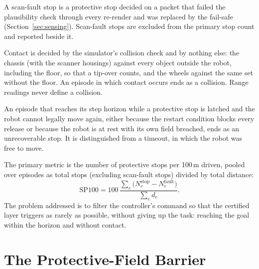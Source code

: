 \documentclass[sensors,article,submit,moreauthors]{Definitions/mdpi}
\begin{document}
\begin{Definition}\label{def:scanfault}
A scan-fault stop is a protective stop decided on a packet that failed the plausibility check through every re-render and was replaced by the fail-safe (Section~\ref{sec:sensing}). Scan-fault stops are excluded from the primary stop count and reported beside it.
\end{Definition}

\begin{Definition}\label{def:contact}
Contact is decided by the simulator's collision check and by nothing else: the chassis (with the scanner housings) against every object outside the robot, including the floor, so that a tip-over counts, and the wheels against the same set without the floor. An episode in which contact occurs ends as a collision. Range readings never define a collision.
\end{Definition}

\begin{Definition}\label{def:unrecoverable}
An episode that reaches its step horizon while a protective stop is latched and the robot cannot legally move again, either because the restart condition blocks every release or because the robot is at rest with its own field breached, ends as an unrecoverable stop. It is distinguished from a timeout, in which the robot was free to move.
\end{Definition}

\noindent The primary metric is the number of protective stops per 100\,m driven, pooled over episodes as total stops (excluding scan-fault stops) divided by total distance:
\begin{equation}
\text{SP100} = 100\,\frac{\sum_e \big(N^{\text{stop}}_e - N^{\text{fault}}_e\big)}{\sum_e d_e}.
\label{eq:sp100}
\end{equation}
The problem addressed is to filter the controller's command so that the certified layer triggers as rarely as possible, without giving up the task: reaching the goal within the horizon and without contact.

\section{The Protective-Field Barrier}\label{sec:pfb}
\end{document}
